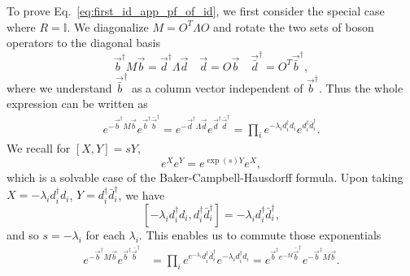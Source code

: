 To prove Eq.~\eqref{eq:first_id_app_pf_of_id}, we first consider the special case where $R=\mathbb{I}$. We diagonalize $M = O^{T} \Lambda O $ and rotate the two sets of boson operators to the diagonal basis
\begin{equation}
  \vec{b}^{\dagger}  M \vec{b} = \vec{d}^{\dagger} \Lambda \vec{d}  \quad \vec{d} = O \vec{b} \quad \vec{\bar{d}}^\dagger = O^T \vec{\bar{b}}^\dagger,
\end{equation}
where we understand $\vec{\bar{b}}^\dagger$ as a column vector independent of $\vec{{b}}^\dagger$. Thus the whole expression can be written as
\begin{equation}
\begin{aligned}
  e^{- \vec{b}^{\dagger} M \vec{b} } e^{ \vec{b}^{\dagger} \bar{\vec{b}}^\dagger }  =  
  e^{- \vec{d}^{\dagger} \Lambda \vec{d} } e^{   \vec{d}^{\dagger} \bar{\vec{d}}^\dagger } = \prod_i  e^{- \lambda_i d_i^{\dagger} d_i } e^{  d_i^{\dagger} \bar{d}_i ^{\dagger} }.
\end{aligned}
\end{equation}
We recall for $ [X, Y] = sY $, 
\begin{equation}
  e^X e^{Y} = e^{\exp (s ) Y} e^{X},
\end{equation}
which is a solvable case of the Baker-Campbell-Hausdorff formula. Upon taking $X = -\lambda_i d_i^{\dagger} d_i$, $Y = d_i^{\dagger} \bar{d}^{\dagger}_i$, we have
\begin{equation}
\label{eq:lambda_commutator}
[- \lambda_i d_i^{\dagger} d_i, d_i ^{\dagger} \bar{d}_i^{\dagger}] =  - \lambda_i  d_i ^{\dagger} \bar{d}_i^{\dagger} ,
\end{equation}
and so $s = - \lambda_i$ for each $\lambda_i$. This enables us to commute those exponentials
\begin{equation}
\begin{aligned}
e^{- \vec{b}^{\dagger} M \vec{b} } e^{  \vec{b}^{\dagger} \bar{\vec{b}}^\dagger }   &= \prod_i e^{ e^{- \lambda_i }  d^{\dagger}_i \bar{d}^{\dagger}_i }  e^{-\lambda_i  d^{\dagger}_i d_i }  = e^{ \vec{b}^{\dagger} e^{-M}  \bar{\vec{b}}^\dagger} e^{- \vec{b}^{\dagger} M \vec{b} }. 
\end{aligned}
\end{equation}
